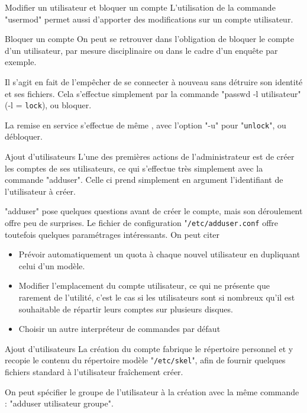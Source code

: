 \documentclass[10pt]{beamer}
\begin{document}
\begin{frame}{Modifier un utilisateur et bloquer un compte}
L'utilisation de la commande "\alert{usermod}" permet aussi d'apporter des modifications
sur un compte utilisateur.

\pause 

\begin{alertblock}{Bloquer un compte}
On peut se retrouver dans l'obligation de bloquer le compte d'un utilisateur, par
mesure disciplinaire ou dans le cadre d'un enquête par exemple. 

Il s'agit en fait de l'empêcher de se connecter à nouveau sans détruire son identité et ses fichiers.
Cela s'effectue simplement par la commande "\alert{passwd -l} utilisateur" (\alert{-l} = \texttt{lock}), ou bloquer. 

La remise en service s'effectue de même , avec l'option "\alert{-u}" pour "\texttt{unlock}", ou débloquer.
\end{alertblock}
\end{frame}

\begin{frame}{Ajout d'utilisateurs}
	L'une des premières actions de l'administrateur est de créer les comptes de ses
	utilisateurs, ce qui s'effectue très simplement avec la commande "\alert{adduser}". Celle ci
	prend simplement en argument l'identifiant de l'utilisateur à créer.
	\pause

	"\alert{adduser}" pose quelques questions avant de créer le compte, mais son déroulement
offre peu de surprises. Le fichier de configuration "\texttt{/etc/adduser.conf} offre toutefois
quelques paramétrages intéressants. On peut citer 
	\begin{itemize}
		\item Prévoir automatiquement un quota à chaque nouvel utilisateur en dupliquant celui d'un modèle.
		\item Modifier l'emplacement du compte utilisateur, ce qui ne présente que rarement de l'utilité, c'est le cas si les utilisateurs sont si nombreux qu'il est souhaitable de
		répartir leurs comptes sur plusieurs disques.
		\item Choisir un autre interpréteur de commandes par défaut
	\end{itemize}
	\end{frame}

	\begin{frame}{Ajout d'utilisateurs}
	La création du compte fabrique le répertoire personnel et y recopie le contenu du répertoire modèle "\texttt{/etc/skel}", afin de fournir quelques fichiers standard à l'utilisateur fraîchement créer.\pause

	On peut spécifier le groupe de l'utilisateur à la création avec la même commande : "\alert{adduser} utilisateur groupe".
\end{frame}
\end{document}
